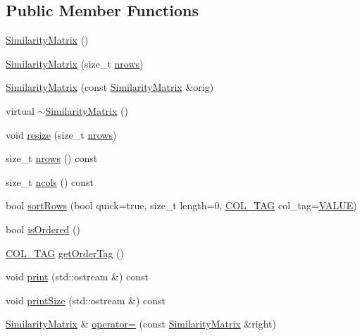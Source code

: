\subsection*{Public Member Functions}
\begin{DoxyCompactItemize}
\item 
\mbox{\hyperlink{class_similarity_matrix_a2aa480c80c6ec721cb46876569b40ed3}{Similarity\+Matrix}} ()
\item 
\mbox{\hyperlink{class_similarity_matrix_ab404f1a6c9f8c6278bf95c287d9095f1}{Similarity\+Matrix}} (size\+\_\+t \mbox{\hyperlink{class_similarity_matrix_a1a52a99f25893158ac083816e1732718}{nrows}})
\item 
\mbox{\hyperlink{class_similarity_matrix_ab9efcf42befb75319c697f28ef862eec}{Similarity\+Matrix}} (const \mbox{\hyperlink{class_similarity_matrix}{Similarity\+Matrix}} \&orig)
\item 
virtual \mbox{\hyperlink{class_similarity_matrix_aeb17fd47c1cd8b42c6b856a863f01452}{$\sim$\+Similarity\+Matrix}} ()
\item 
void \mbox{\hyperlink{class_similarity_matrix_a53caceef5b63b494cdf5a8f4a19d6e32}{resize}} (size\+\_\+t \mbox{\hyperlink{class_similarity_matrix_a1a52a99f25893158ac083816e1732718}{nrows}})
\item 
size\+\_\+t \mbox{\hyperlink{class_similarity_matrix_a1a52a99f25893158ac083816e1732718}{nrows}} () const
\item 
size\+\_\+t \mbox{\hyperlink{class_similarity_matrix_af06f9d9d8e531a72def89d65c44531a4}{ncols}} () const
\item 
bool \mbox{\hyperlink{class_similarity_matrix_ab19ea17143e530072b9d903f7721b873}{sort\+Rows}} (bool quick=true, size\+\_\+t length=0, \mbox{\hyperlink{class_similarity_matrix_a79098014d74c2cf85f0dd8ad7fc4ac4f}{C\+O\+L\+\_\+\+T\+AG}} col\+\_\+tag=\mbox{\hyperlink{class_similarity_matrix_a79098014d74c2cf85f0dd8ad7fc4ac4faf5942e194b9ec347c132ae2211f3782c}{V\+A\+L\+UE}})
\item 
bool \mbox{\hyperlink{class_similarity_matrix_a7751368aa489720f189c30f9c5e86910}{is\+Ordered}} ()
\item 
\mbox{\hyperlink{class_similarity_matrix_a79098014d74c2cf85f0dd8ad7fc4ac4f}{C\+O\+L\+\_\+\+T\+AG}} \mbox{\hyperlink{class_similarity_matrix_ae4d6b35cecadba128fd8cfbf2b9a0b8c}{get\+Order\+Tag}} ()
\item 
void \mbox{\hyperlink{class_similarity_matrix_af8aa5c9e5d71534dcd2fcdfb6029a2ef}{print}} (std\+::ostream \&) const
\item 
void \mbox{\hyperlink{class_similarity_matrix_a02a975af5873db869f894891fa05e826}{print\+Size}} (std\+::ostream \&) const
\item 
\mbox{\hyperlink{class_similarity_matrix}{Similarity\+Matrix}} \& \mbox{\hyperlink{class_similarity_matrix_a8481d69ccd6d4d240805e729375566b4}{operator=}} (const \mbox{\hyperlink{class_similarity_matrix}{Similarity\+Matrix}} \&right)
\end{DoxyCompactItemize}
